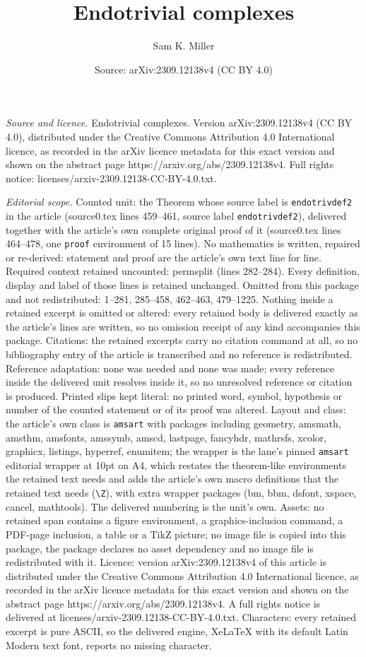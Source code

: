 \documentclass[10pt,a4paper]{amsart}
\title[Endotrivial complexes]{Endotrivial complexes}
\author{Sam K. Miller}
\date{Source: arXiv:2309.12138v4 (CC BY 4.0)}
\begin{document}
\maketitle

\noindent\emph{Source and licence.} Endotrivial complexes. Version arXiv:2309.12138v4 (CC BY 4.0), distributed under the Creative Commons Attribution 4.0 International licence, as recorded in the arXiv licence metadata for this exact version and shown on the abstract page https://arxiv.org/abs/2309.12138v4. Full rights notice: licenses/arxiv-2309.12138-CC-BY-4.0.txt.\par\smallskip

\noindent\textit{Editorial scope.} Counted unit: the Theorem whose source label is \texttt{endotrivdef2} in the article (source0.tex lines 459--461, source label \texttt{endotrivdef2}), delivered together with the article's own complete original proof of it (source0.tex lines 464--478, one \texttt{proof} environment of 15 lines). No mathematics is written, repaired or re-derived: statement and proof are the article's own text line for line. Required context retained uncounted: permsplit (lines 282--284). Every definition, display and label of those lines is retained unchanged. Omitted from this package and not redistributed: 1--281, 285--458, 462--463, 479--1225. Nothing inside a retained excerpt is omitted or altered: every retained body is delivered exactly as the article's lines are written, so no omission receipt of any kind accompanies this package. Citations: the retained excerpts carry no citation command at all, so no bibliography entry of the article is transcribed and no reference is redistributed. Reference adaptation: none was needed and none was made; every reference inside the delivered unit resolves inside it, so no unresolved reference or citation is produced. Printed slips kept literal: no printed word, symbol, hypothesis or number of the counted statement or of its proof was altered. Layout and class: the article's own class is \texttt{amsart} with packages including geometry, amsmath, amsthm, amsfonts, amssymb, amscd, lastpage, fancyhdr, mathrsfs, xcolor, graphicx, listings, hyperref, enumitem; the wrapper is the lane's pinned \texttt{amsart} editorial wrapper at 10pt on A4, which restates the theorem-like environments the retained text needs and adds the article's own macro definitions that the retained text needs (\texttt{\textbackslash Z}), with extra wrapper packages (bm, bbm, dsfont, xspace, cancel, mathtools). The delivered numbering is the unit's own. Assets: no retained span contains a figure environment, a graphics-inclusion command, a PDF-page inclusion, a table or a TikZ picture; no image file is copied into this package, the package declares no asset dependency and no image file is redistributed with it. Licence: version arXiv:2309.12138v4 of this article is distributed under the Creative Commons Attribution 4.0 International licence, as recorded in the arXiv licence metadata for this exact version and shown on the abstract page https://arxiv.org/abs/2309.12138v4. A full rights notice is delivered at licenses/arxiv-2309.12138-CC-BY-4.0.txt. Characters: every retained excerpt is pure ASCII, so the delivered engine, XeLaTeX with its default Latin Modern text font, reports no missing character.
\end{document}
